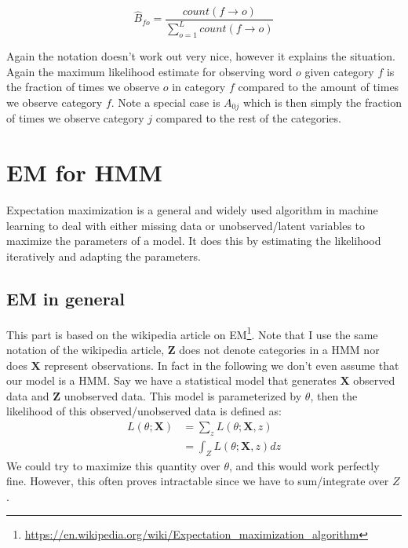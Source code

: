 \begin{equation}
	\hat{B}_{fo} = \frac{count({f\rightarrow o})}{\sum_{o=1}^{L}count({f\rightarrow o})}
\end{equation}

Again the notation doesn't work out very nice, however it explains the situation. Again the maximum likelihood estimate for observing word $o$ given category $f$ is the fraction of times we observe $o$ in category $f$ compared to the amount of times we observe category $f$. Note a special case is $A_{0j}$ which is then simply the fraction of times we observe category $j$ compared to the rest of the categories.

\section{EM for HMM}
Expectation maximization is a general and widely used algorithm in machine learning to deal with either missing data or unobserved/latent variables to maximize the parameters of a model. It does this by estimating the likelihood iteratively and adapting the parameters.

\subsection{EM in \textbf{general}}
This part is based on the wikipedia article on EM\footnote{\url{https://en.wikipedia.org/wiki/Expectation_maximization_algorithm}}. Note that I use the same notation of the wikipedia article, $\textbf{Z}$ does not denote categories in a HMM nor does $\textbf{X}$ represent observations. In fact in the following we don't even assume that our model is a HMM.
Say we have a statistical model that generates $\textbf{X}$ observed data and $\textbf{Z}$ unobserved data. This model is parameterized by \textbf{$\theta$}, then the likelihood of this observed/unobserved data is defined as:
\begin{equation}
\begin{split}
L(\theta;\textbf{X}) &= \sum_{z} L(\theta;\textbf{X},z)\\
&= \int_{Z}L(\theta;\textbf{X},z)dz
\end{split}
\end{equation}
We could try to maximize this quantity over $\theta$, and this would work perfectly fine. However, this often proves intractable since we have to sum/integrate over $Z$.\\

